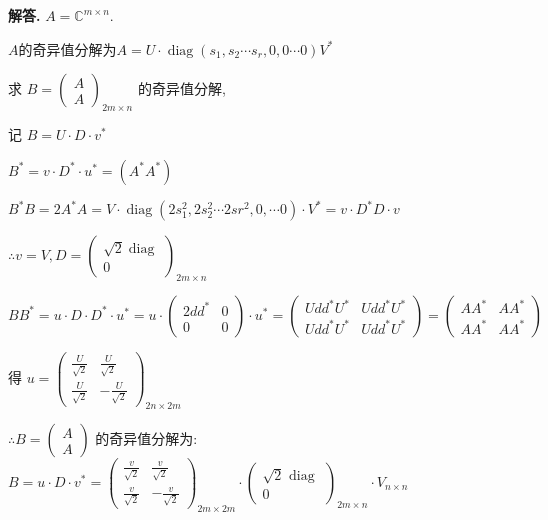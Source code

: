 \documentclass[12pt, a4paper, oneside]{ctexart}
\newcounter{problemname}
\newenvironment{solution}{\par\noindent\textbf{解答. }}{\par}
\newenvironment{note}{\par\noindent\textbf{题目\arabic{problemname}的注记. }}{\par}
\begin{document}
\begin{solution}
    $A=\mathbb{C}^{m \times n} $.

    $ A $的奇异值分解为$  A=U \cdot \operatorname{diag}\left(s_{1}, s_{2} \cdots s_{r}, 0,0 \cdots 0\right) V^{*}$
    
    求  $B=\left(\begin{array}{l}A \\ A\end{array}\right)_{2 m \times n} $ 的奇异值分解,
    
    记 $ B=U \cdot D \cdot v^{*} $
    
    $B^{*}=v \cdot D^{*} \cdot u^{*}=\left(A^{*} A^{*}\right)$
    
    $B^{*} B=2 A^{*} A=V \cdot \operatorname{diag}\left(2 s_{1}^{2}, 2 s_{2}^{2} \cdots 2 s r^{2}, 0, \cdots 0\right) \cdot V^{*} =v \cdot D^{*} D \cdot v $
    
    $\therefore v=V, D=\left(\begin{array}{c}\sqrt{2} \operatorname{diag} \\0\end{array}\right)_{2 m \times n} $
    
    $B B^{*}=u \cdot D \cdot D^{*} \cdot u^{*} =u \cdot\left(\begin{array}{cc}2 d d^{*} & 0 \\0 & 0\end{array}\right) \cdot u^{*}=\left(\begin{array}{cc}U d d^{*} U^{*} & U d d^{*} U^{*} \\U d d^{*} U^{*} & U d d^{*} U^{*}\end{array}\right)=\left(\begin{array}{cc}A A^{*} & A A^{*} \\A A^{*} & A A^{*}\end{array}\right) $
    
    得 $ u=\left(\begin{array}{cc}\frac{U}{\sqrt{2}} & \frac{U}{\sqrt{2}} \\ \frac{U}{\sqrt{2}} & -\frac{U}{\sqrt{2}}\end{array}\right)_{2 n \times 2 m} $ 
    
    $\therefore B=\left(\begin{array}{l}A \\ A\end{array}\right)$  的奇异值分解为: $ B=u \cdot D \cdot v^{*}=\left(\begin{array}{cc}\frac{v}{\sqrt{2}} & \frac{v}{\sqrt{2}} \\ \frac{v}{\sqrt{2}} & -\frac{v}{\sqrt{2}}\end{array}\right)_{2m\times 2m} \cdot\left(\begin{array}{c}\sqrt{2} \text { diag } \\ 0\end{array}\right)_{2 m \times n} \cdot V_{n \times n} $
\end{solution}

\end{document}
